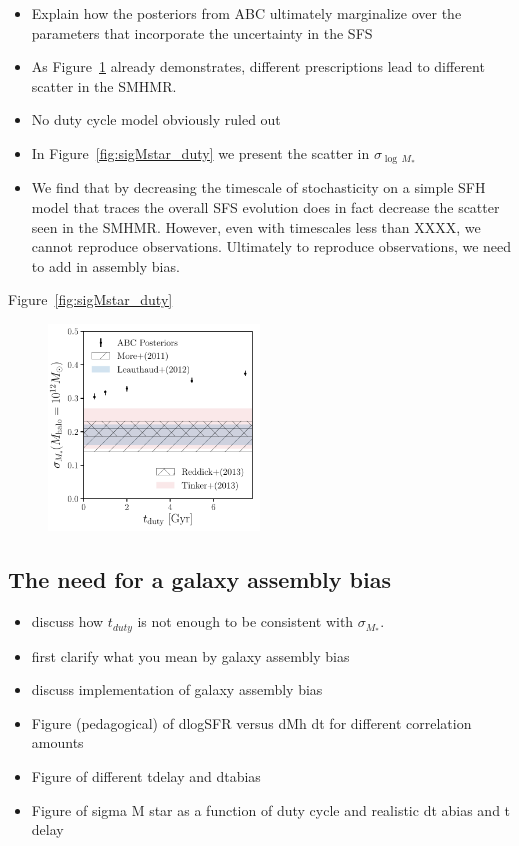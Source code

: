 \documentclass[12pt, letterpaper, preprint]{aastex}
\newcommand{\bitem}{\begin{itemize}}
\newcommand{\eitem}{\end{itemize}}
\begin{document}
\bitem
\item Explain how the posteriors from ABC ultimately marginalize over the parameters that incorporate the 
    uncertainty in the SFS 
\item As Figure~\ref{fig:abc_demo} already demonstrates, different prescriptions lead to different scatter in the SMHMR. 
\item No duty cycle model obviously ruled out 
\item In Figure~\ref{fig:sigMstar_duty} we present the scatter in $\sigma_{\log\,M_*}$
\item We find that by decreasing the timescale of stochasticity on a simple SFH model that traces the overall 
SFS evolution does in fact decrease the scatter seen in the SMHMR. However, even with timescales less
than XXXX, we cannot reproduce observations. Ultimately to reproduce observations, we need to add in 
assembly bias. 
\eitem

Figure~\ref{fig:sigMstar_duty} 

\begin{figure}
\begin{center}
\includegraphics[width=0.5\textwidth]{figs/sigMstar_tduty.pdf}
\caption{}
\label{fig:abc_demo}
\end{center}
\end{figure}

\subsection{The need for a galaxy assembly bias}
\bitem
\item discuss how $t_{duty}$ is not enough to be consistent with $\sigma_{M_*}$. 
\item first clarify what you mean by galaxy assembly bias 
\item discuss implementation of galaxy assembly bias
\item Figure (pedagogical) of dlogSFR versus dMh dt for different correlation amounts 
\item Figure of different tdelay and dtabias 
\item Figure of sigma M star as a function of duty cycle and realistic dt abias and t delay 
\eitem
\end{document}

